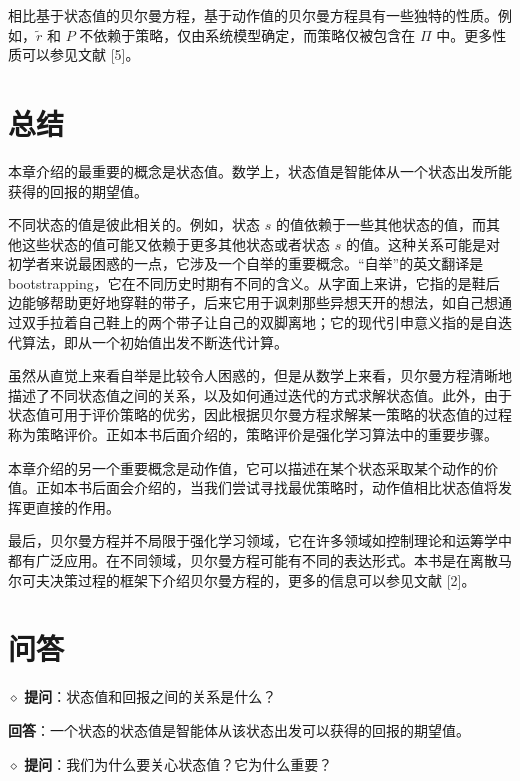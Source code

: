 相比基于状态值的贝尔曼方程，基于动作值的贝尔曼方程具有一些独特的性质。例如，$\tilde{r}$ 和 $P$ 不依赖于策略，仅由系统模型确定，而策略仅被包含在 $\Pi$ 中。更多性质可以参见文献 [5]。

\section{总结}
\label{sec:rl-bellman-summary}

本章介绍的最重要的概念是状态值。数学上，状态值是智能体从一个状态出发所能获得的回报的期望值。

不同状态的值是彼此相关的。例如，状态 $s$ 的值依赖于一些其他状态的值，而其他这些状态的值可能又依赖于更多其他状态或者状态 $s$ 的值。这种关系可能是对初学者来说最困惑的一点，它涉及一个自举的重要概念。“自举”的英文翻译是 bootstrapping，它在不同历史时期有不同的含义。从字面上来讲，它指的是鞋后边能够帮助更好地穿鞋的带子，后来它用于讽刺那些异想天开的想法，如自己想通过双手拉着自己鞋上的两个带子让自己的双脚离地；它的现代引申意义指的是自迭代算法，即从一个初始值出发不断迭代计算。

虽然从直觉上来看自举是比较令人困惑的，但是从数学上来看，贝尔曼方程清晰地描述了不同状态值之间的关系，以及如何通过迭代的方式求解状态值。此外，由于状态值可用于评价策略的优劣，因此根据贝尔曼方程求解某一策略的状态值的过程称为策略评价。正如本书后面介绍的，策略评价是强化学习算法中的重要步骤。

本章介绍的另一个重要概念是动作值，它可以描述在某个状态采取某个动作的价值。正如本书后面会介绍的，当我们尝试寻找最优策略时，动作值相比状态值将发挥更直接的作用。

最后，贝尔曼方程并不局限于强化学习领域，它在许多领域如控制理论和运筹学中都有广泛应用。在不同领域，贝尔曼方程可能有不同的表达形式。本书是在离散马尔可夫决策过程的框架下介绍贝尔曼方程的，更多的信息可以参见文献 [2]。

\section{问答}
\label{sec:rl-bellman-qa}

\medskip
$\diamond$ \textbf{提问}：状态值和回报之间的关系是什么？

\textbf{回答}：一个状态的状态值是智能体从该状态出发可以获得的回报的期望值。

\medskip
$\diamond$ \textbf{提问}：我们为什么要关心状态值？它为什么重要？

